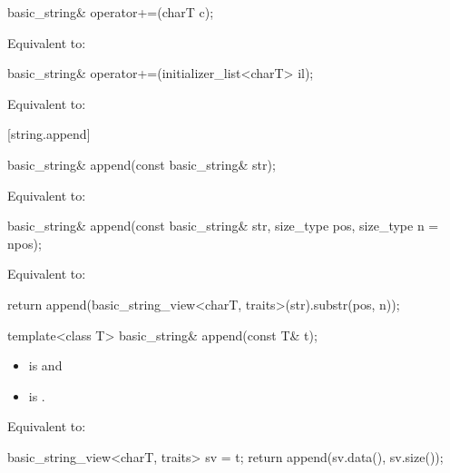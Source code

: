 %
\begin{itemdecl}
basic_string& operator+=(charT c);
\end{itemdecl}

\begin{itemdescr}
\pnum
\effects Equivalent to: 
\end{itemdescr}

%
\begin{itemdecl}
basic_string& operator+=(initializer_list<charT> il);
\end{itemdecl}

\begin{itemdescr}
\pnum
\effects Equivalent to: 
\end{itemdescr}


[string.append]{}

%
\begin{itemdecl}
basic_string& append(const basic_string& str);
\end{itemdecl}

\begin{itemdescr}
\pnum
\effects Equivalent to: 
\end{itemdescr}

%
\begin{itemdecl}
basic_string& append(const basic_string& str, size_type pos, size_type n = npos);
\end{itemdecl}

\begin{itemdescr}
\pnum
\effects
Equivalent to:
\begin{codeblock}
return append(basic_string_view<charT, traits>(str).substr(pos, n));
\end{codeblock}
\end{itemdescr}

%
\begin{itemdecl}
template<class T>
  basic_string& append(const T& t);
\end{itemdecl}

\begin{itemdescr}
\pnum
\constraints
\begin{itemize}
\item
{} is
 and
\item
{} is
.
\end{itemize}

\pnum
\effects
Equivalent to:
\begin{codeblock}
basic_string_view<charT, traits> sv = t;
return append(sv.data(), sv.size());
\end{codeblock}
\end{itemdescr}

